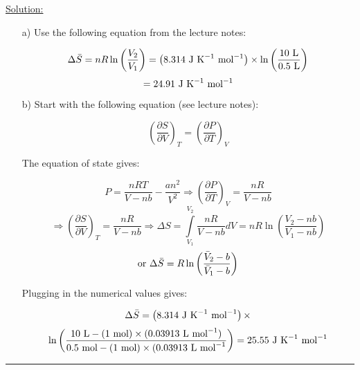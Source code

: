 \noindent
\underline{Solution:}\\

\begin{itemize}

\item[a)] Use the following equation from the lecture notes:

$$\Delta \bar{S} = nR\ln\left(\frac{V_2}{V_1}\right) = \left(8.314\textnormal{ J K}^{-1}\textnormal{ mol}^{-1}\right)\times\ln\left(\frac{10\textnormal{ L}}{0.5\textnormal{ L}}\right)$$
$$ = 24.91\textnormal{ J K}^{-1}\textnormal{ mol}^{-1}$$

\item[b)] Start with the following equation (see lecture notes):

$$\left(\frac{\partial S}{\partial V}\right)_T = \left(\frac{\partial P}{\partial T}\right)_V$$

The equation of state gives:

$$P = \frac{nRT}{V - nb} - \frac{an^2}{V^2} \Rightarrow \left(\frac{\partial P}{\partial T}\right)_V = \frac{nR}{V - nb}$$
$$\Rightarrow \left(\frac{\partial S}{\partial V}\right)_T = \frac{nR}{V - nb} \Rightarrow \Delta S = \int\limits_{V_1}^{V_2}\frac{nR}{V -nb}dV = nR\ln\left(\frac{V_2 - nb}{V_1 - nb}\right)$$
$$\textnormal{or }\Delta\bar{S} = R\ln\left(\frac{\bar{V}_2 - b}{\bar{V}_1 - b}\right)$$

Plugging in the numerical values gives:

$$\Delta \bar{S} = \left(8.314\textnormal{ J K}^{-1}\textnormal{ mol}^{-1}\right)\times$$
$$\ln\left(\frac{10\textnormal{ L} - (1\textnormal{ mol})\times (0.03913\textnormal{ L mol}^{-1})}{0.5\textnormal{ mol} - (1\textnormal{ mol})\times (0.03913\textnormal{ L mol}^{-1}}\right) = 25.55\textnormal{ J K}^{-1}\textnormal{ mol}^{-1}$$

\end{itemize}

\hrule\vspace{0.5cm}
